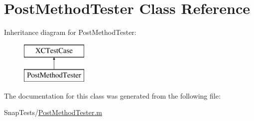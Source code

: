 \hypertarget{interface_post_method_tester}{}\section{Post\+Method\+Tester Class Reference}
\label{interface_post_method_tester}
Inheritance diagram for Post\+Method\+Tester\+:\begin{figure}[H]
\begin{center}
\leavevmode
\includegraphics[height=2.000000cm]{interface_post_method_tester}
\end{center}
\end{figure}


The documentation for this class was generated from the following file\+:\begin{DoxyCompactItemize}
\item 
Snap\+Tests/\hyperlink{_post_method_tester_8m}{Post\+Method\+Tester.\+m}\end{DoxyCompactItemize}
